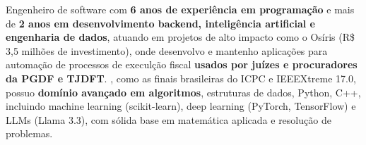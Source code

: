 \documentclass[a4paper,12pt]{article}
\begin{document}

Engenheiro de software com  \textbf{6 anos de experiência em programação} e mais de \textbf{2 anos em desenvolvimento backend,
inteligência artificial e engenharia de dados}, atuando em projetos de alto impacto como o Osíris (R\$ 3,5 milhões de investimento),
onde desenvolvo e mantenho aplicações para automação de processos de execulção fiscal \textbf{usados por juízes e procuradores da PGDF e TJDFT}.
, como as finais brasileiras do ICPC e IEEEXtreme 17.0,
possuo \textbf{domínio avançado em algoritmos}, estruturas de dados, Python, C++, incluindo machine learning (scikit-learn),
deep learning (PyTorch, TensorFlow) e LLMs (Llama 3.3), com sólida base em matemática aplicada e resolução de problemas.
\end{document}
